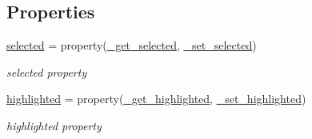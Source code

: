 \subsection*{Properties}
\begin{DoxyCompactItemize}
\item 
\hyperlink{classvisualizer_1_1core_1_1Node_af8f554d655e00a2cd0f25e8adaca8a02}{selected} = property(\hyperlink{classvisualizer_1_1core_1_1Node_aa122aa19624f41bde75b477e019c7fdb}{\+\_\+get\+\_\+selected}, \hyperlink{classvisualizer_1_1core_1_1Node_a3ceba64906269d901c47af74a60f06a0}{\+\_\+set\+\_\+selected})
\begin{DoxyCompactList}\small\item\em selected property \end{DoxyCompactList}\item 
\hyperlink{classvisualizer_1_1core_1_1Node_a4bf6c669466a274f80bb1ac72b6c067a}{highlighted} = property(\hyperlink{classvisualizer_1_1core_1_1Node_aacbcdfc12f4b0d7dc0b70034de8216d5}{\+\_\+get\+\_\+highlighted}, \hyperlink{classvisualizer_1_1core_1_1Node_ae5beb3fb1baf0a82aac7d97095be2e03}{\+\_\+set\+\_\+highlighted})
\begin{DoxyCompactList}\small\item\em highlighted property \end{DoxyCompactList}\end{DoxyCompactItemize}
